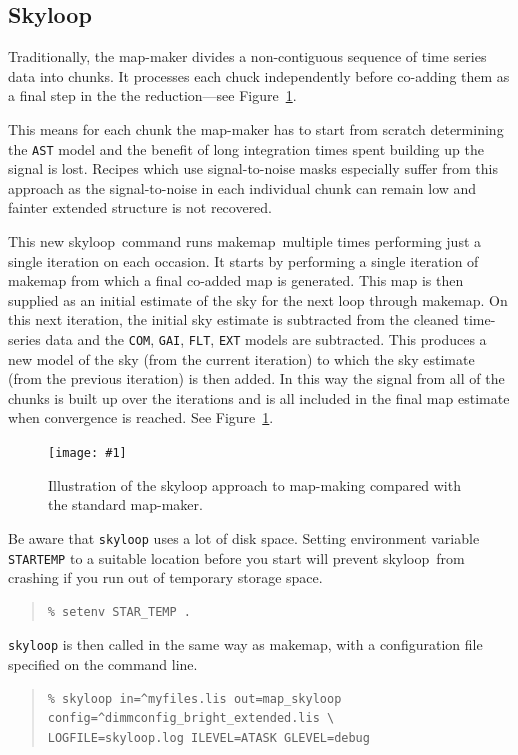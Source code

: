 \documentclass[twoside,11pt]{article}
\newcommand{\htmladdimg}[1]{}
\newcommand{\htmlref}[2]{#1}
\newcommand{\latexhtml}[2]{#1}
\newcommand{\xref}[3]{#1}
\newcommand{\xlabel}[1]{}
\renewcommand{\_}{\texttt{\symbol{95}}}
\newenvironment{myquote}{\begin{quote}\begin{small}}{\end{small}\end{quote}}
\newcommand{\task}[1]{\textsf{#1}}
\newcommand{\makemap}{\xref{\task{makemap}}{sun258}{MAKEMAP}}
\newcommand{\skyloop}{\xref{\task{skyloop}}{sun258}{SKYLOOP}}
\newcommand{\myfig}[6]{
  \begin{figure}#2
    \centering\texttt{[image: \#1]}
    \typeout{#1 inserted on page \arabic{page}}
    \caption[#5]{\label{#4}\small #6}
  \end{figure}
}
\newcommand{\myfig}[6]{
    \label{#4} \htmladdimg{#1.png}\\
    \\
    Figure: #6\\
  }
\newcommand{\cref}[3]{\latexhtml{#1~\ref{#2}}{\htmlref{#3}{#2}}}
\begin{document}
\subsection{\xlabel{skyloop}Skyloop}
\label{sec:skyloop}

Traditionally, the map-maker divides a non-contiguous sequence of time
series data into chunks. It processes each chuck independently
before co-adding them as a final step in the the reduction---see
\cref{Figure}{fig:skyloop}{the figure below}.

This means for each chunk the map-maker has to start from scratch
determining the \texttt{AST} model and the benefit of long integration
times spent building up the signal is lost. Recipes which use
signal-to-noise masks especially suffer from this approach as the
signal-to-noise in each individual chunk can remain low and fainter
extended structure is not recovered.

This new \skyloop\ command runs \makemap\ multiple times
performing just a single iteration on each occasion. It starts by
performing a single iteration of \task{makemap} from which a final
co-added map is generated. This map is then supplied as an initial
estimate of the sky for the next loop through \task{makemap}. On
this next iteration, the initial sky estimate is subtracted from the
cleaned time-series data and the \texttt{COM}, \texttt{GAI},
\texttt{FLT}, \texttt{EXT} models are subtracted. This produces a new
model of the sky (from the current iteration) to which the sky
estimate (from the previous iteration) is then added. In this way the
signal from all of the chunks is built up over the iterations and is
all included in the final map estimate when convergence is reached.
See \cref{Figure}{fig:skyloop}{the diagram below}.


\myfig{sc21_skyloop}{[h!]}{width=0.55\linewidth}{fig:skyloop}{
  Illustration of the \task{skyloop} approach}{
  Illustration of the \task{skyloop} approach
  to map-making compared with the standard map-maker.
}

Be aware that \texttt{skyloop} uses a lot of disk space. Setting
environment variable \texttt{STAR\_TEMP} to a suitable location
before you start will prevent \skyloop\ from crashing
if you run out of temporary storage space.
\begin{myquote}
\begin{verbatim}
% setenv STAR_TEMP .
\end{verbatim}
\end{myquote}
\texttt{skyloop} is then called in the same way as \makemap, with
 a configuration file specified on the command line.
\begin{myquote}
\begin{verbatim}
% skyloop in=^myfiles.lis out=map_skyloop config=^dimmconfig_bright_extended.lis \
LOGFILE=skyloop.log ILEVEL=ATASK GLEVEL=debug
\end{verbatim}
\end{myquote}
\end{document}
